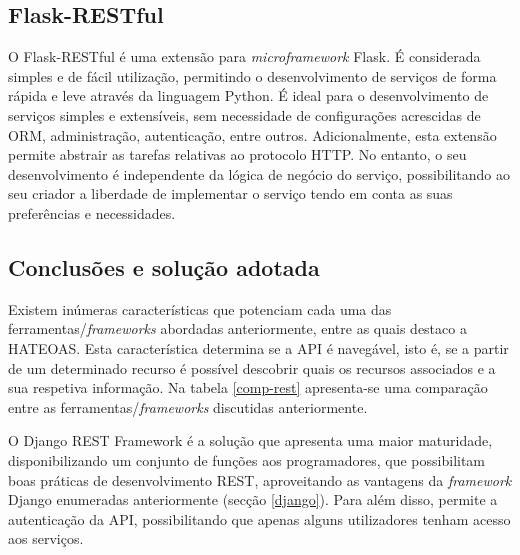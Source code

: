  





\subsection{Flask-RESTful}

O Flask-RESTful é uma extensão para \textit{microframework} Flask. É considerada simples e de fácil utilização, permitindo o desenvolvimento de serviços de forma rápida e leve através da linguagem Python. É ideal para o desenvolvimento de serviços simples e extensíveis, sem necessidade de configurações acrescidas de \ac{ORM}, administração,  autenticação, entre outros\cite{Flask-RESTful2017}.  Adicionalmente, esta extensão permite abstrair as tarefas relativas ao protocolo \ac{HTTP}. No entanto, o seu desenvolvimento é independente da lógica de negócio do serviço, possibilitando ao seu criador a liberdade de implementar o serviço tendo em conta as suas preferências e necessidades.  




\subsection{Conclusões e solução adotada}


Existem inúmeras características que potenciam cada uma das ferramentas/\textit{frameworks} abordadas anteriormente, entre as quais destaco a \ac{HATEOAS}. Esta característica determina se a API é  navegável, isto é, se a partir de um determinado recurso é possível descobrir quais os recursos associados e a sua respetiva informação. Na tabela \ref{comp-rest} apresenta-se uma comparação entre as ferramentas/\textit{frameworks} discutidas anteriormente. 


O Django REST Framework é a solução que apresenta uma maior maturidade, disponibilizando um conjunto de funções aos programadores, que possibilitam boas práticas de desenvolvimento \ac{REST}, aproveitando as vantagens da \textit{framework} Django enumeradas anteriormente (secção \ref{django}). Para além disso, permite a autenticação da API, possibilitando que apenas alguns utilizadores tenham acesso aos serviços. 






